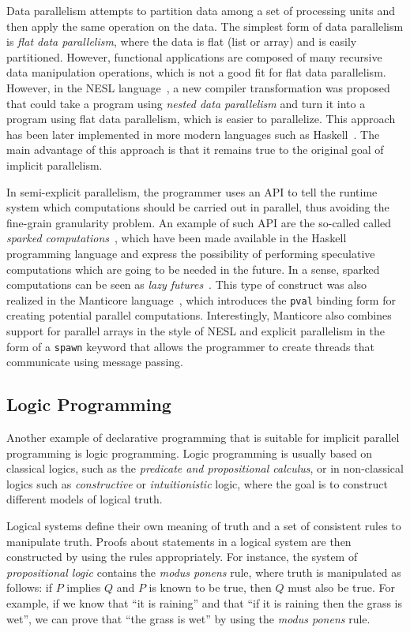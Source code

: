 Data parallelism attempts to partition data among a set of processing units and
then apply the same operation on the data. The simplest form of data parallelism
is \emph{flat data parallelism}, where the data is flat (list or array) and is
easily partitioned. However, functional applications are composed of many recursive
data manipulation operations, which is not a good fit for flat data parallelism.
However, in the NESL language~\cite{Blelloch:1996:PPA:227234.227246}, a new compiler
transformation was proposed that could take a program using \emph{nested data
parallelism} and turn it into a program using flat data parallelism, which is
easier to parallelize. This approach has been later implemented in more
modern languages such as Haskell~\cite{Chakravarty07dataparallel}. The main
advantage of this approach is that it remains true to the original goal of
implicit parallelism.

In semi-explicit parallelism, the programmer uses an API to tell the runtime
system which computations should be carried out in parallel, thus avoiding the
fine-grain granularity problem. An example of such API are the so-called called
\emph{sparked computations}~\cite{Marlow:2010}, which have been made available
in the Haskell programming language and express the possibility of performing
speculative computations which are going to be needed in the future. In a sense,
sparked computations can be seen as \emph{lazy futures}~\cite{Baker:1977}. This
type of construct was also realized in the Manticore language~\cite{Fluet:2010},
which introduces the \texttt{pval} binding form for creating potential parallel
computations. Interestingly, Manticore also combines support for parallel arrays
in the style of NESL and explicit parallelism in the form of a \texttt{spawn}
keyword that allows the programmer to create threads that communicate using
message passing.

\subsection{Logic Programming}

Another example of declarative programming that is suitable for implicit
parallel programming is logic programming.
Logic programming is usually based on classical logics, such as the
\emph{predicate and propositional calculus}, or in non-classical logics such as
\emph{constructive} or \emph{intuitionistic} logic, where the goal is to
construct different models of logical truth.

Logical systems define their own meaning of truth and a set of consistent rules
to manipulate truth. Proofs about statements in a logical system are then
constructed by using the rules appropriately. For instance, the system of
\emph{propositional logic} contains the \emph{modus ponens} rule, where truth is
manipulated as follows: if $P$ implies $Q$ and $P$ is known to be true,
then $Q$ must also be true. For example, if we know that ``it is raining'' and that ``if
it is raining then the grass is wet'', we can prove that ``the grass is wet'' by
using the \emph{modus ponens} rule.

